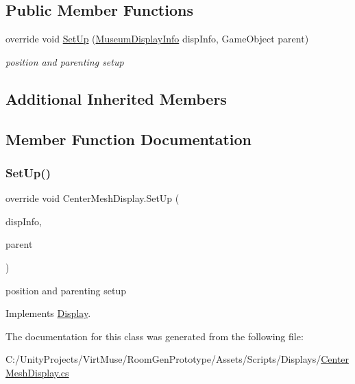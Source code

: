 \subsection*{Public Member Functions}
\begin{DoxyCompactItemize}
\item 
override void \mbox{\hyperlink{class_center_mesh_display_a9d14ccee557aa886938d1d86ee016930}{Set\+Up}} (\mbox{\hyperlink{class_museum_display_info}{Museum\+Display\+Info}} disp\+Info, Game\+Object parent)
\begin{DoxyCompactList}\small\item\em position and parenting setup \end{DoxyCompactList}\end{DoxyCompactItemize}
\subsection*{Additional Inherited Members}


\subsection{Member Function Documentation}
\mbox{\label{class_center_mesh_display_a9d14ccee557aa886938d1d86ee016930}} 
\subsubsection{\texorpdfstring{Set\+Up()}{SetUp()}}
{\footnotesize\ttfamily override void Center\+Mesh\+Display.\+Set\+Up (\begin{DoxyParamCaption}\item[{\mbox{\hyperlink{class_museum_display_info}{Museum\+Display\+Info}}}]{disp\+Info,  }\item[{Game\+Object}]{parent }\end{DoxyParamCaption})\hspace{0.3cm}{\ttfamily [virtual]}}



position and parenting setup 



Implements \mbox{\hyperlink{class_display_a57325251fbeac943cd48520e50f0bec4}{Display}}.



The documentation for this class was generated from the following file\+:\begin{DoxyCompactItemize}
\item 
C\+:/\+Unity\+Projects/\+Virt\+Muse/\+Room\+Gen\+Prototype/\+Assets/\+Scripts/\+Displays/\mbox{\hyperlink{_center_mesh_display_8cs}{Center\+Mesh\+Display.\+cs}}\end{DoxyCompactItemize}
